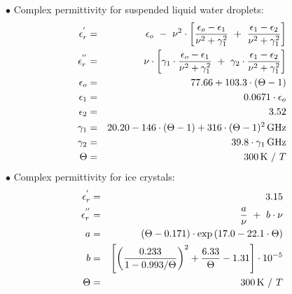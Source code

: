\noindent$\bullet$ Complex permittivity for suspended liquid water droplets:
\begin{eqnarray}
  \label{eq:comp_perm_lwc}
  \ree       & = & \epsilon_o~-~\nu^2\cdot
                   \left[\frac{\epsilon_o-\epsilon_1}{\nu^2+\gamma_1^2}~+~
                   \frac{\epsilon_1-\epsilon_2}{\nu^2+\gamma_1^2}\right]\nonumber\\
%
  \ime       & = & \nu\cdot\left[\gamma_1\cdot
                   \frac{\epsilon_o-\epsilon_1}{\nu^2+\gamma_1^2}~+~
                   \gamma_2\cdot\frac{\epsilon_1-\epsilon_2}{\nu^2+\gamma_1^2}\right]\nonumber\\
%
  \label{eq:comp_perm_lwc_epsilon_0}
  \epsilon_o & = & 77.66 + 103.3\cdot(\Theta-1)\\
  \epsilon_1 & = & 0.0671\cdot\epsilon_o\nonumber\\
  \epsilon_2 & = & 3.52\nonumber\\
%
  \label{eq:comp_perm_lwc_gamma_1}
  \gamma_1   & = & 20.20 - 146\cdot(\Theta-1) + 316\cdot(\Theta-1)^2\,\mbox{GHz}\\
  \gamma_2   & = & 39.8\cdot\gamma_1\,\mbox{GHz}\nonumber\\
%
  \Theta     & = & 300\,\mbox{K}~/~T\nonumber
%
\end{eqnarray}
$\bullet$ Complex permittivity for ice crystals:
\begin{eqnarray}
  \label{eq:comp_perm_iwc}
  \ree    & = & 3.15\nonumber\\
%
  \ime    & = & \frac{a}{\nu}~+~b\cdot\nu\nonumber\\
%
  \label{eq:comp_perm_iwc_a}
  a       & = & (\Theta-0.171)\cdot\exp{(17.0-22.1\cdot\Theta)}\\
  \label{eq:comp_perm_iwc_b}
  b       & = & \left[\left(\frac{0.233}{1-0.993/\Theta}\right)^2 + 
                \frac{6.33}{\Theta} - 1.31\right]\cdot10^{-5}\\
%
  \Theta  & = & 300\,\mbox{K}~/~T\nonumber
%
\end{eqnarray}
